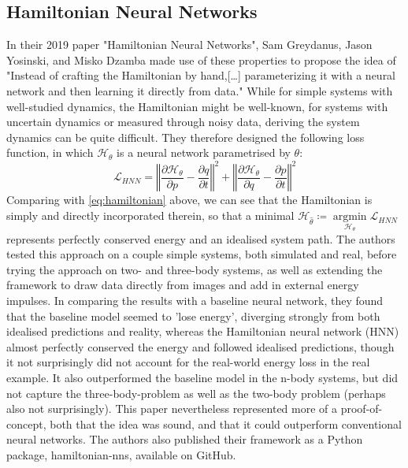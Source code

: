 \documentclass[10 pt, a4paper]{article}
\DeclareMathOperator*{\argmin}{argmin}
\begin{document}
\subsection{Hamiltonian Neural Networks}
In their 2019 paper "Hamiltonian Neural Networks", Sam Greydanus, Jason Yosinski, and Misko Dzamba made use of these properties to propose the idea of "Instead of crafting the Hamiltonian by hand,[…] parameterizing it with a neural network and then learning it directly from data."\cite{hnn} While for simple systems with well-studied dynamics, the Hamiltonian might be well-known, for systems with uncertain dynamics or measured through noisy data, deriving the system dynamics can be quite difficult. They therefore designed the following loss function, in which $\mathcal{H}_{\theta}$ is a neural network parametrised by $\theta$:
\begin{equation*}
	\mathcal{L}_{HNN} = \left\Vert \frac{\partial\mathcal{H}_\theta}{\partial p} - \frac{\partial q}{\partial t}\right\Vert^2 + \left\Vert \frac{\partial\mathcal{H}_\theta}{\partial q} - \frac{\partial p}{\partial t}\right\Vert^2
\end{equation*}
Comparing with \eqref{eq:hamiltonian} above, we can see that the Hamiltonian is simply and directly incorporated therein, so that a minimal $\mathcal{H}_{\hat{\theta}}\coloneqq \argmin\limits_{\mathcal{H}_\theta}\mathcal{L}_{HNN}$ represents perfectly conserved energy and an idealised system path. The authors tested this approach on a couple simple systems, both simulated and real, before trying the approach on two- and three-body systems, as well as extending the framework to draw data directly from images and add in external energy impulses. In comparing the results with a baseline neural network, they found that the baseline model seemed to 'lose energy', diverging strongly from both idealised predictions and reality, whereas the Hamiltonian neural network (HNN) almost perfectly conserved the energy and followed idealised predictions, though it not surprisingly did not account for the real-world energy loss in the real example. It also outperformed the baseline model in the n-body systems, but did not capture the three-body-problem as well as the two-body problem (perhaps also not surprisingly). This paper nevertheless represented more of a proof-of-concept, both that the idea was sound, and that it could outperform conventional neural networks. The authors also published their framework as a Python package, hamiltonian-nns, available on GitHub.
\begin{comment}
	\texttt{[image: overall-idea]}
\end{comment}
\end{document}
